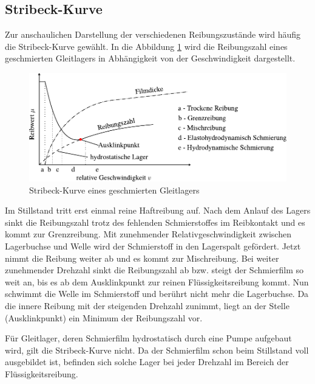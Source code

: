\subsection{Stribeck-Kurve}
\label{sub:stribeck-kurve}

Zur anschaulichen Darstellung der verschiedenen Reibungszustände wird häufig die Stribeck-Kurve gewählt.
In die Abbildung \ref{fig:stribeck-kurve} wird die Reibungszahl eines geschmierten Gleitlagers in Abhängigkeit von der Geschwindigkeit dargestellt.
\begin{figure}[htb]
    \centering
    \includegraphics[]{./images/stribeckkurve.pdf}
    \caption{Stribeck-Kurve eines geschmierten Gleitlagers \cite{ikz_haustechnik}}
    \label{fig:stribeck-kurve}
\end{figure}
%

Im Stillstand tritt erst einmal reine Haftreibung auf.
Nach dem Anlauf des Lagers sinkt die Reibungszahl trotz des fehlenden Schmierstoffes im Reibkontakt und es kommt zur Grenzreibung.
Mit zunehmender Relativgeschwindigkeit zwischen Lagerbuchse und Welle wird der Schmierstoff in den Lagerspalt gefördert.
Jetzt nimmt die Reibung weiter ab und es kommt zur Mischreibung.
Bei weiter zunehmender Drehzahl sinkt die Reibungszahl ab bzw. steigt der Schmierfilm so weit an, bis es ab dem Ausklinkpunkt zur reinen Flüssigkeitsreibung kommt.
Nun schwimmt die Welle im Schmierstoff und berührt nicht mehr die Lagerbuchse.
Da die innere Reibung mit der steigenden Drehzahl zunimmt, liegt an der Stelle (Ausklinkpunkt) ein Minimum der Reibungszahl vor.

Für Gleitlager, deren Schmierfilm hydrostatisch durch eine Pumpe aufgebaut wird, gilt die Stribeck-Kurve nicht.
Da der Schmierfilm schon beim Stillstand voll ausgebildet ist, befinden sich solche Lager bei jeder Drehzahl im Bereich der Flüssigkeitsreibung.

